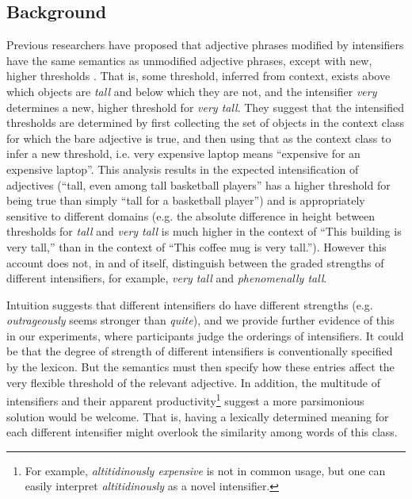\documentclass[10pt,letterpaper]{article}
\newcommand{\w}[1]{\emph{#1}}
\newcommand{\todo}[1]{{\color{red}#1}}
\begin{document}
\subsection{Background}
Previous researchers have proposed that adjective phrases modified by intensifiers have the same semantics as unmodified adjective phrases, except with new, higher thresholds \cite{kennedyMcnally, klein, wheeler}. That is, some threshold, inferred from context, exists above which objects are \w{tall} and below which they are not, and the intensifier \w{very} determines a new, higher threshold for \w{very tall}.
They suggest that the intensified thresholds are determined by first collecting the set of objects in the context class for which the bare adjective is true, and then using that as the context class to infer a new threshold, i.e. very expensive laptop means “expensive for an expensive laptop”. This analysis results in the expected intensification of adjectives (``tall, even among tall basketball players'' has a higher threshold for being true than simply ``tall for a basketball player'') and is appropriately sensitive to different domains (e.g. the absolute difference in height between thresholds for \w{tall} and \w{very tall} is much higher in the context of ``This building is very tall,'' than in the context of ``This coffee mug is very tall.'').
However this account does not, in and of itself, distinguish between the graded strengths of different intensifiers, for example, \w{very tall} and \w{phenomenally tall}.

Intuition suggests that different intensifiers do have different strengths (e.g. \w{outrageously} seems stronger than \w{quite}), and we provide further evidence of this in our experiments, where participants judge the orderings of intensifiers.
It could be that the degree of strength of different intensifiers is conventionally specified by the lexicon. But the semantics must then specify how these entries affect the very flexible threshold of the relevant adjective.
In addition, the multitude of intensifiers \cite{bolinger} and their apparent productivity\footnote{For example, \w{altitidinously expensive} is not in common usage, but one can easily interpret \w{altitidinously} as a novel intensifier.} suggest a more parsimonious solution would be welcome. 
That is, having a lexically determined meaning for each different intensifier might overlook the similarity among words of this class.
\end{document}
